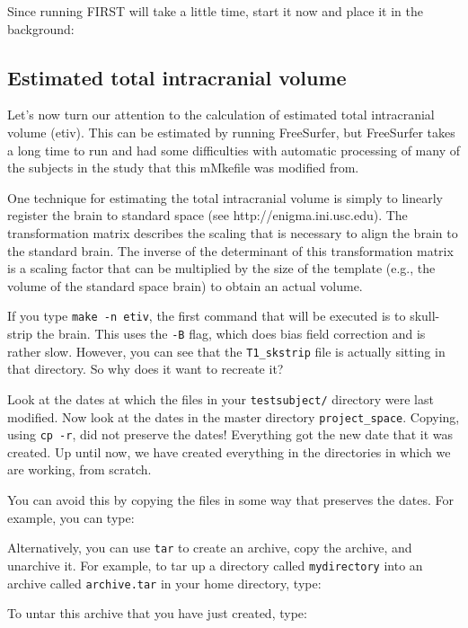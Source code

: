 Since running FIRST will take a little time, start it now and place it in the background:

\subsection{Estimated total intracranial volume}
Let's now turn our attention to the calculation of estimated total intracranial volume (etiv). This can be estimated by running FreeSurfer, but FreeSurfer takes a long time to run and had some difficulties with automatic processing of many of the subjects in the study that this mMkefile was modified from. 

One technique for estimating the total intracranial volume is simply
to linearly register the brain to standard space (see http://enigma.ini.usc.edu). The transformation
matrix describes the scaling that is necessary to align the brain to
the standard brain. The inverse of the determinant of this
transformation matrix is a scaling factor that can be multiplied by the size of the template (e.g., the volume of the standard space brain) to obtain an actual volume.

If you type \texttt{make -n etiv}, the first command that will be executed is to skull-strip the brain. This uses the \texttt{-B} flag, which does bias field correction and is rather slow. However, you can see that the \texttt{T1_skstrip} file is actually sitting in that directory. So why does it want to recreate it?

Look at the dates at which the files in your \texttt{testsubject/} directory were last modified. Now look at the dates in the master directory \texttt{project_space}. Copying, using \texttt{cp -r}, did not preserve the dates! Everything got the new date that it was created. Up until now, we have created everything in the directories in which we are working, from scratch. 

You can avoid this by copying the files in some way that preserves the dates. For example,
you can type:

Alternatively, you can use \texttt{tar} to create an archive, copy the archive, and unarchive it.
For example, to tar up a directory called \texttt{mydirectory} into an archive called \texttt{archive.tar} in your home directory, type:

To untar this archive that you have just created, type:

